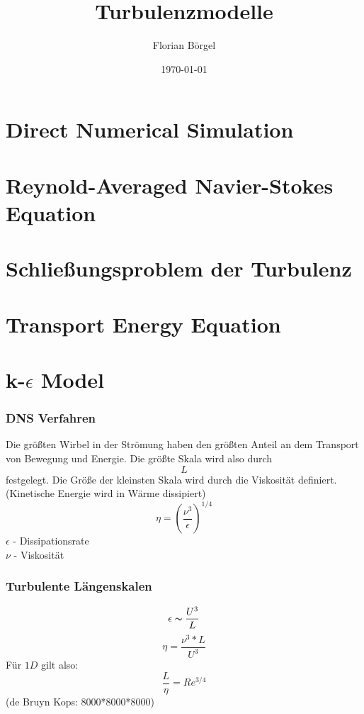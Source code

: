 \documentclass[11pt,t]{beamer}
\title[Theoretische Ozeanographie]{Turbulenzmodelle}
\author[Florian Börgel]{Florian Börgel}
\date{\today}
\institute{Universität Oldenburg}
\begin{document}
\frame{\titlepage}

\section{Direct Numerical Simulation}
\section{Reynold-Averaged Navier-Stokes Equation}
\section{Schließungsproblem der Turbulenz}
\section{Transport Energy Equation}
\section{k-$\epsilon$ Model}
\begin{frame}
	\frametitle{DNS Verfahren}
Die größten Wirbel in der Strömung haben den größten Anteil an dem Transport von Bewegung und Energie. Die größte Skala wird also durch 
\begin{equation}
L
\end{equation}
festgelegt. Die Größe der kleinsten Skala wird durch die Viskosität definiert. (Kinetische Energie wird in Wärme dissipiert)
\begin{equation}
\eta = (\frac{\nu^3}{\epsilon})^{1/4}
\end{equation}
\hspace{1cm}$\epsilon$ - Dissipationsrate\\
\hspace{1cm}$\nu$ - Viskosität
\end{frame}


\begin{frame}
	\frametitle{Turbulente Längenskalen}
\begin{equation}
\epsilon\thicksim \frac{U^3}{L}
\end{equation}
\begin{equation}
\eta = \frac{\nu^3 * L}{U^3}
\end{equation}
Für $1D$ gilt also:
\begin{equation}
\frac{L}{\eta} = Re^{3/4} 
\end{equation}
(de Bruyn Kops: 8000*8000*8000)
\end{frame}
\end{document}
